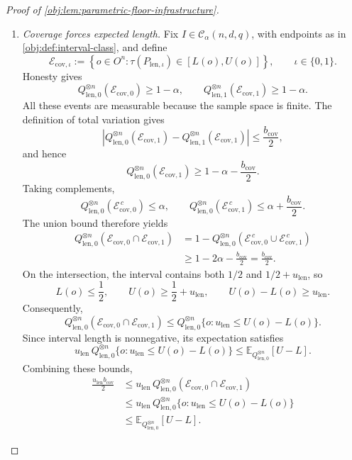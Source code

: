 \begin{proof}[Proof of \cref{obj:lem:parametric-floor-infrastructure}]
\begin{enumerate}
\item \emph{Coverage forces expected length.}
Fix \(I\in\mathcal C_\alpha(n,d,q)\), with endpoints as in \cref{obj:def:interval-class}, and define
\[
\mathcal E_{\mathrm{cov},\iota}
:=
\left\{
o\in O^n:
\tau(P_{\mathrm{len},\iota})\in[L(o),U(o)]
\right\},
\qquad \iota\in\{0,1\}.
\]
Honesty gives
\[
Q_{\mathrm{len},0}^{\otimes n}(\mathcal E_{\mathrm{cov},0})
\ge1-\alpha,
\qquad
Q_{\mathrm{len},1}^{\otimes n}(\mathcal E_{\mathrm{cov},1})
\ge1-\alpha.
\]
All these events are measurable because the sample space is finite. The definition of total variation gives
\[
\left|
Q_{\mathrm{len},0}^{\otimes n}(\mathcal E_{\mathrm{cov},1})
-
Q_{\mathrm{len},1}^{\otimes n}(\mathcal E_{\mathrm{cov},1})
\right|
\le\frac{b_{\mathrm{cov}}}{2},
\]
and hence
\[
Q_{\mathrm{len},0}^{\otimes n}(\mathcal E_{\mathrm{cov},1})
\ge1-\alpha-\frac{b_{\mathrm{cov}}}{2}.
\]
Taking complements,
\[
Q_{\mathrm{len},0}^{\otimes n}(\mathcal E_{\mathrm{cov},0}^{\,c})
\le\alpha,
\qquad
Q_{\mathrm{len},0}^{\otimes n}(\mathcal E_{\mathrm{cov},1}^{\,c})
\le\alpha+\frac{b_{\mathrm{cov}}}{2}.
\]
The union bound therefore yields
\[
\begin{aligned}
Q_{\mathrm{len},0}^{\otimes n}
 (\mathcal E_{\mathrm{cov},0}\cap\mathcal E_{\mathrm{cov},1})
&=
1-
Q_{\mathrm{len},0}^{\otimes n}
 (\mathcal E_{\mathrm{cov},0}^{\,c}
  \cup\mathcal E_{\mathrm{cov},1}^{\,c})\\
&\ge1-2\alpha-\frac{b_{\mathrm{cov}}}{2}
=\frac{b_{\mathrm{cov}}}{2}.
\end{aligned}
\]
On the intersection, the interval contains both \(1/2\) and \(1/2+u_{\mathrm{len}}\), so
\[
L(o)\le\frac12,
\qquad
U(o)\ge\frac12+u_{\mathrm{len}},
\qquad
U(o)-L(o)\ge u_{\mathrm{len}}.
\]
Consequently,
\[
Q_{\mathrm{len},0}^{\otimes n}
 (\mathcal E_{\mathrm{cov},0}\cap\mathcal E_{\mathrm{cov},1})
\le
Q_{\mathrm{len},0}^{\otimes n}
 \{o:u_{\mathrm{len}}\le U(o)-L(o)\}.
\]
Since interval length is nonnegative, its expectation satisfies
\[
u_{\mathrm{len}}\,
Q_{\mathrm{len},0}^{\otimes n}
 \{o:u_{\mathrm{len}}\le U(o)-L(o)\}
\le
\mathbb E_{Q_{\mathrm{len},0}^{\otimes n}}[U-L].
\]
Combining these bounds,
\[
\begin{aligned}
\frac{u_{\mathrm{len}}b_{\mathrm{cov}}}{2}
&\le
u_{\mathrm{len}}\,
Q_{\mathrm{len},0}^{\otimes n}
 (\mathcal E_{\mathrm{cov},0}\cap\mathcal E_{\mathrm{cov},1})\\
&\le
u_{\mathrm{len}}\,
Q_{\mathrm{len},0}^{\otimes n}
 \{o:u_{\mathrm{len}}\le U(o)-L(o)\}\\
&\le
\mathbb E_{Q_{\mathrm{len},0}^{\otimes n}}[U-L].
\end{aligned}
\]


\end{enumerate}
\end{proof}
